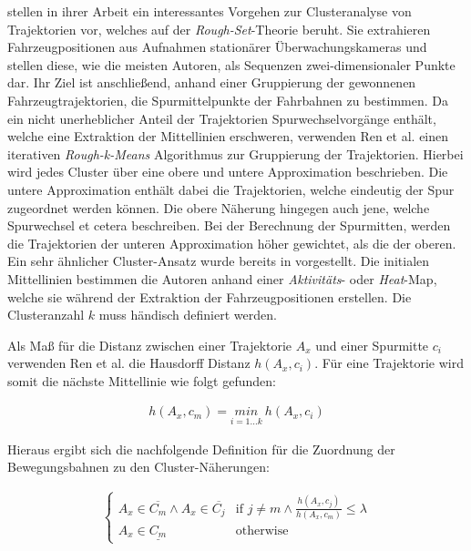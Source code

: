 \cite[]{Ren2014} stellen in ihrer Arbeit ein interessantes Vorgehen zur Clusteranalyse von Trajektorien vor,
welches auf der \textit{Rough-Set}-Theorie beruht. Sie extrahieren Fahrzeugpositionen aus Aufnahmen stationärer
Überwachungskameras und stellen diese, wie die meisten Autoren, als Sequenzen zwei-dimensionaler
Punkte dar. Ihr Ziel ist anschließend, anhand einer Gruppierung der gewonnenen Fahrzeugtrajektorien,
die Spurmittelpunkte der Fahrbahnen zu bestimmen. Da ein nicht unerheblicher Anteil der Trajektorien Spurwechselvorgänge
enthält, welche eine Extraktion der Mittellinien erschweren, verwenden Ren et al. einen iterativen \textit{Rough-k-Means}
Algorithmus zur Gruppierung der Trajektorien. Hierbei wird jedes Cluster über eine obere und untere Approximation beschrieben.
Die untere Approximation enthält dabei die Trajektorien, welche eindeutig der Spur zugeordnet werden können.
Die obere Näherung hingegen auch jene, welche Spurwechsel et cetera beschreiben. Bei der Berechnung der Spurmitten, werden
die Trajektorien der unteren Approximation höher gewichtet, als die der oberen. Ein sehr ähnlicher Cluster-Ansatz wurde
bereits in \cite[]{Lingras2004} vorgestellt.
Die initialen Mittellinien bestimmen die Autoren anhand einer \textit{Aktivitäts}- oder \textit{Heat}-Map,
welche sie während der Extraktion der Fahrzeugpositionen erstellen. Die Clusteranzahl $k$ muss händisch definiert werden.

Als Maß für die Distanz zwischen einer Trajektorie $A_x$ und einer Spurmitte $c_i$ verwenden Ren et al. die
Hausdorff Distanz $h(A_x, c_i)$. Für eine Trajektorie wird somit die nächste Mittellinie wie folgt gefunden:

\begin{ceqn}
\begin{align}
    h(A_x, c_m) = \underset{i = 1 ... k}{min}\ h(A_x, c_i)
\end{align}
\end{ceqn}

Hieraus ergibt sich die nachfolgende Definition für die Zuordnung der Bewegungsbahnen zu den Cluster-Näherungen:

\begin{ceqn}
\begin{align}
    \begin{cases}
        A_x \in \overline{C_m} \land A_x \in \overline{C_j} & \text{if } j \neq m \land \frac{h(A_x, c_j)}{h(A_x, c_m)} \leq \lambda \\
        A_x \in \underline{C_m} & \text{otherwise}
    \end{cases}
\end{align}
\end{ceqn}

